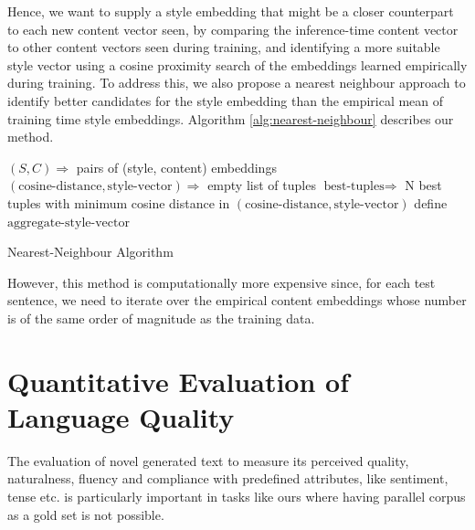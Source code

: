 Hence, we want to supply a style embedding that might be a closer counterpart to each new content vector seen, by comparing the inference-time content vector to other content vectors seen during training, and identifying a more suitable style vector using a cosine proximity search of the embeddings learned empirically during training. To address this, we also propose a nearest neighbour approach to identify better candidates for the style embedding than the empirical mean of training time style embeddings. Algorithm \ref{alg:nearest-neighbour} describes our method.

\begin{algorithm}[H]
	$(S, C) \Rightarrow$ pairs of (style, content) embeddings\;
	$(\text{cosine-distance}, \text{style-vector}) \Rightarrow$ empty list of tuples\;
	$\text{best-tuples} \Rightarrow$ N best tuples with minimum cosine distance in $(\text{cosine-distance}, \text{style-vector})$\;
	define $\text{aggregate-style-vector}$\;
	\;

	\caption{\label{alg:nearest-neighbour} Nearest-Neighbour Algorithm}
\end{algorithm}

However, this method is computationally more expensive since, for each test sentence, we need to iterate over the empirical content embeddings whose number is of the same order of magnitude as the training data.


\section{Quantitative Evaluation of Language Quality}

The evaluation of novel generated text to measure its perceived quality, naturalness, fluency and compliance with predefined attributes, like sentiment, tense etc. is particularly important in tasks like ours where having parallel corpus as a gold set is not possible.

